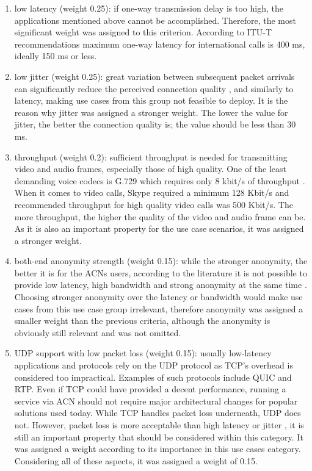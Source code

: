 \begin{enumerate}
    \item low latency (weight 0.25): if one-way transmission delay is too high, the applications mentioned above cannot be accomplished. Therefore, the most significant weight was assigned to this criterion. According to ITU-T recommendations \cite{ITU-G.114} maximum one-way latency for international calls is 400 ms, ideally 150 ms or less.
    \item low jitter (weight 0.25): great variation between subsequent packet arrivals can significantly reduce the perceived connection quality \cite{voip-tor}, and similarly to latency,  making use cases from this group not feasible to deploy. It is the reason why jitter was assigned a stronger weight. The lower the value for jitter, the better the connection quality is; the value should be less than 30 ms.
    \item throughput (weight 0.2): sufficient throughput is needed for transmitting video and audio frames, especially those of high quality. One of the least demanding voice codecs is G.729 which requires only 8 kbit/s of throughput \cite{ITU-G.729}. When it comes to video calls, Skype required \cite{microsoft-skype-bandwidth} a minimum 128 Kbit/s and recommended throughput for high quality video calls was 500 Kbit/s. The more throughput, the higher the quality of the video and audio frame can be. As it is also an important property for the use case scenarios, it was assigned a stronger weight.
    \item both-end anonymity strength (weight 0.15): while the stronger anonymity, the better it is for the ACNs users, according to the literature it is not possible to provide low latency, high bandwidth and strong anonymity at the same time \cite{anonymity-trillema}. Choosing stronger anonymity over the latency or bandwidth would make use cases from this use case group irrelevant, therefore anonymity was assigned a smaller weight than the previous criteria, although the anonymity is obviously still relevant and was not omitted.
    \item UDP support with low packet loss (weight 0.15): usually low-latency applications and protocols rely on the UDP protocol as TCP’s overhead is considered too impractical. Examples of such protocols include QUIC and RTP. Even if TCP could have provided a decent performance, running a service via ACN should not require major architectural changes for popular solutions used today. While TCP handles packet loss underneath, UDP does not. However, packet loss is more acceptable than high latency or jitter \cite{voip-tor}, it is still an important property that should be considered within this category. It was assigned a weight according to its importance in this use cases category.  Considering all of these aspects, it was assigned a weight of 0.15.
\end{enumerate}

